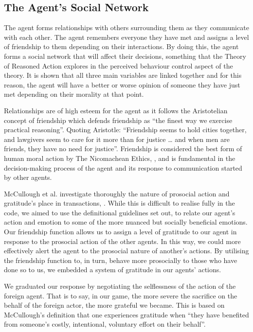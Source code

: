 \subsection{The Agent’s Social Network}
The agent forms relationships with others surrounding them as they communicate with each other. The agent remembers everyone they have met and assigns a level of friendship to them depending on their interactions. By doing this, the agent forms a social network that will affect their decisions, something that the Theory of Reasoned Action explores in the perceived behaviour control aspect of the theory. It is shown that all three main variables are linked together and for this reason, the agent will have a better or worse opinion of someone they have just met depending on their morality at that point. \par
Relationships are of high esteem for the agent as it follows the Aristotelian concept of friendship which defends friendship as “the finest way we exercise practical reasoning”. Quoting Aristotle: “Friendship seems to hold cities together, and lawgivers seem to care for it more than for justice … and when men are friends, they have no need for justice”. Friendship is considered the best form of human moral action by The Nicomachean Ethics, \cite{sokolowski}, and is fundamental in the decision-making process of the agent and its response to communication started by other agents. \par 
McCullough et al. investigate thoroughly the nature of prosocial action and gratitude’s place in transactions, \cite{doi:10.1111/j.1467-8721.2008.00590.x}. While this is difficult to realise fully in the code, we aimed to use the definitional guidelines set out, to relate our agent’s action and emotion to some of the more nuanced but socially beneficial emotions. Our friendship function allows us to assign a level of gratitude to our agent in response to the prosocial action of the other agents. In this way, we could more effectively alert the agent to the prosocial nature of another’s actions. By utilising the friendship function to, in turn, behave more prosocially to those who have done so to us, we embedded a system of gratitude in our agents’ actions. \par
We graduated our response by negotiating the selflessness of the action of the foreign agent. That is to say, in our game, the more severe the sacrifice on the behalf of the foreign actor, the more grateful we became. This is based on McCullough’s definition that one experiences gratitude when “they have benefited from someone’s costly, intentional, voluntary effort on their behalf”. \par 
